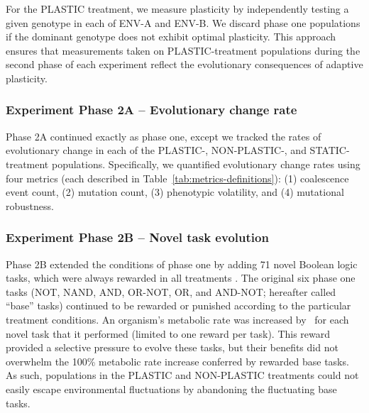 For the PLASTIC treatment, we measure plasticity by independently testing a given genotype in each of ENV-A and ENV-B.
We discard phase one populations if the dominant genotype does not exhibit optimal plasticity.
This approach ensures that measurements taken on PLASTIC-treatment populations during the second phase of each experiment reflect the evolutionary consequences of adaptive plasticity.

\subsubsection{Experiment Phase 2A -- Evolutionary change rate}
\label{sec:methods:exp:evolutionary-change-rate}

Phase 2A continued exactly as phase one, except we tracked the rates of evolutionary change in each of the PLASTIC-, NON-PLASTIC-, and STATIC-treatment populations. 
Specifically, we quantified evolutionary change rates using four metrics (each described in Table~\ref{tab:metrics-definitions}):
(1) coalescence event count,
(2) mutation count, 
(3) phenotypic volatility,
and (4) mutational robustness.

\subsubsection{Experiment Phase 2B -- Novel task evolution}
\label{sec:methods:exp:novel-task-evolution}

Phase 2B extended the conditions of phase one by adding 71 novel Boolean logic tasks, which were always rewarded in all treatments \citep{ofria_avida:_2009}.
The original six phase one tasks (NOT, NAND, AND, OR-NOT, OR, and AND-NOT; hereafter called ``base'' tasks) continued to be rewarded or punished according to the particular treatment conditions.
An organism's metabolic rate was increased by \novelTraitsReward\ for each novel task that it performed (limited to one reward per task).
This reward provided a selective pressure to evolve these tasks, but their benefits did not overwhelm the 100\% metabolic rate increase conferred by rewarded base tasks.
As such, populations in the PLASTIC and NON-PLASTIC treatments could not easily escape environmental fluctuations by abandoning the fluctuating base tasks.

